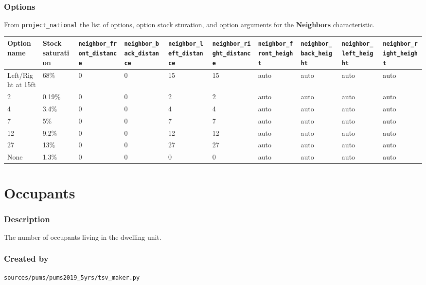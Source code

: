 \subsubsection{Options}\label{options-125}

From \texttt{project\_national} the list of options, option stock
sturation, and option arguments for the \textbf{Neighbors}
characteristic.

\begin{longtable}[]{@{}llllllllll@{}}
\toprule\noalign{}
Option name & Stock saturation & \texttt{neighbor\_front\_distance} &
\texttt{neighbor\_back\_distance} & \texttt{neighbor\_left\_distance} &
\texttt{neighbor\_right\_distance} & \texttt{neighbor\_front\_height} &
\texttt{neighbor\_back\_height} & \texttt{neighbor\_left\_height} &
\texttt{neighbor\_right\_height} \\
\midrule\noalign{}
\endhead
\bottomrule\noalign{}
\endlastfoot
Left/Right at 15ft & 68\% & 0 & 0 & 15 & 15 & auto & auto & auto &
auto \\
2 & 0.19\% & 0 & 0 & 2 & 2 & auto & auto & auto & auto \\
4 & 3.4\% & 0 & 0 & 4 & 4 & auto & auto & auto & auto \\
7 & 5\% & 0 & 0 & 7 & 7 & auto & auto & auto & auto \\
12 & 9.2\% & 0 & 0 & 12 & 12 & auto & auto & auto & auto \\
27 & 13\% & 0 & 0 & 27 & 27 & auto & auto & auto & auto \\
None & 1.3\% & 0 & 0 & 0 & 0 & auto & auto & auto & auto \\
\end{longtable}

\section{Occupants}\label{occupants}

\subsubsection{Description}\label{description-122}

The number of occupants living in the dwelling unit.

\subsubsection{Created by}\label{created-by-123}

\texttt{sources/pums/pums2019\_5yrs/tsv\_maker.py}

